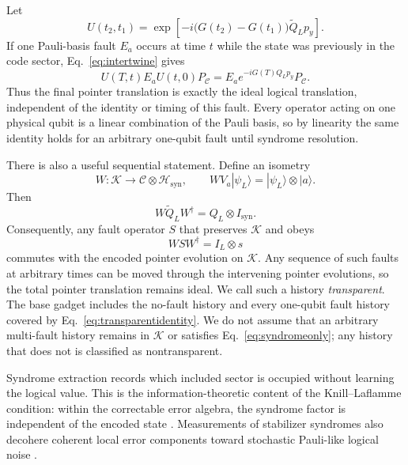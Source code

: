 \documentclass[pdflatex,sn-mathphys-num]{sn-jnl}
\theoremstyle{thmstyleone}
\begin{document}
Let
\begin{equation}
U(t_2,t_1)=
\exp\!\left[-i\bigl(G(t_2)-G(t_1)\bigr)\widetilde Q_Lp_y\right].
\end{equation}
If one Pauli-basis fault $E_a$ occurs at time $t$ while the state was previously in the code sector, Eq.~\eqref{eq:intertwine} gives
\begin{equation}
U(T,t)E_aU(t,0)P_{\mathcal C}
=E_a e^{-iG(T)Q_Lp_y}P_{\mathcal C}.
\label{eq:transparentidentity}
\end{equation}
Thus the final pointer translation is exactly the ideal logical translation, independent of the identity or timing of this fault. Every operator acting on one physical qubit is a linear combination of the Pauli basis, so by linearity the same identity holds for an arbitrary one-qubit fault until syndrome resolution.

There is also a useful sequential statement. Define an isometry
\begin{equation}
W:\mathcal K\longrightarrow \mathcal C\otimes\mathcal H_{\mathrm{syn}},
\qquad
WV_a|\psi_L\rangle=|\psi_L\rangle\otimes|a\rangle.
\end{equation}
Then
\begin{equation}
W\widetilde Q_LW^\dagger=Q_L\otimes I_{\mathrm{syn}}.
\end{equation}
Consequently, any fault operator $S$ that preserves $\mathcal K$ and obeys
\begin{equation}
WSW^\dagger=I_L\otimes s
\label{eq:syndromeonly}
\end{equation}
commutes with the encoded pointer evolution on $\mathcal K$. Any sequence of such faults at arbitrary times can be moved through the intervening pointer evolutions, so the total pointer translation remains ideal. We call such a history \emph{transparent}. The base gadget includes the no-fault history and every one-qubit fault history covered by Eq.~\eqref{eq:transparentidentity}. We do not assume that an arbitrary multi-fault history remains in $\mathcal K$ or satisfies Eq.~\eqref{eq:syndromeonly}; any history that does not is classified as nontransparent.

Syndrome extraction records which included sector is occupied without learning the logical value. This is the information-theoretic content of the Knill--Laflamme condition: within the correctable error algebra, the syndrome factor is independent of the encoded state \cite{KnillLaflamme1997}. Measurements of stabilizer syndromes also decohere coherent local error components toward stochastic Pauli-like logical noise \cite{Beale2018}.
\end{document}
